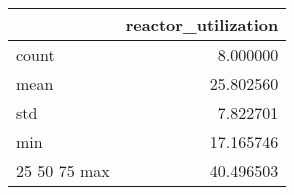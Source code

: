 \begin{tabular}{lr}
\toprule
 & reactor\_utilization \\
\midrule
count & 8.000000 \\
mean & 25.802560 \\
std & 7.822701 \\
min & 17.165746 \\
25%
50%
75%
max & 40.496503 \\
\bottomrule
\end{tabular}


